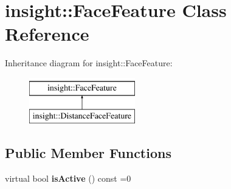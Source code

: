 \hypertarget{classinsight_1_1FaceFeature}{}\section{insight\+:\+:Face\+Feature Class Reference}
\label{classinsight_1_1FaceFeature}
Inheritance diagram for insight\+:\+:Face\+Feature\+:\begin{figure}[H]
\begin{center}
\leavevmode
\includegraphics[height=2.000000cm]{classinsight_1_1FaceFeature}
\end{center}
\end{figure}
\subsection*{Public Member Functions}
\begin{DoxyCompactItemize}
\item 
\hypertarget{classinsight_1_1FaceFeature_ae614b2893cb2f9bd6180195286985000}{}virtual bool {\bfseries is\+Active} () const  =0\label{classinsight_1_1FaceFeature_ae614b2893cb2f9bd6180195286985000}

\end{DoxyCompactItemize}
